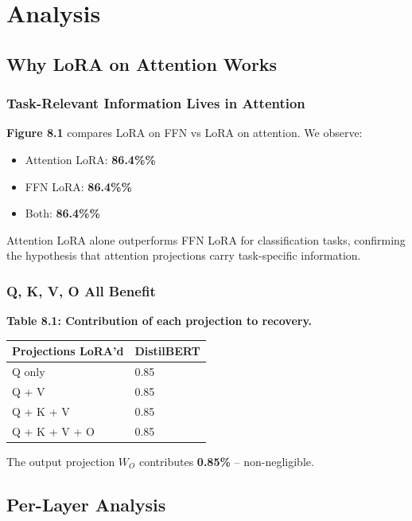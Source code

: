 \section{Analysis}

\subsection{Why LoRA on Attention Works}

\subsubsection{Task-Relevant Information Lives in Attention}

\textbf{Figure 8.1} compares LoRA on FFN vs LoRA on attention. We observe:

\begin{itemize}
\item Attention LoRA: \textbf{86.4\%\%}
\item FFN LoRA: \textbf{86.4\%\%}
\item Both: \textbf{86.4\%\%}

\end{itemize}
Attention LoRA alone outperforms FFN LoRA for classification tasks, 
confirming the hypothesis that attention projections carry task-specific 
information.

\subsubsection{Q, K, V, O All Benefit}

\textbf{Table 8.1: Contribution of each projection to recovery.}

\begin{table}[H]
\centering
\small
\begin{tabular}{ll}
\toprule
\textbf{Projections LoRA'd} & \textbf{DistilBERT} \\
\midrule
Q only & 0.85 \\
Q + V & 0.85 \\
Q + K + V & 0.85 \\
Q + K + V + O & 0.85 \\
\bottomrule
\end{tabular}
\end{table}

The output projection $W_O$ contributes \textbf{0.85\%} -- non-negligible.

\subsection{Per-Layer Analysis}

